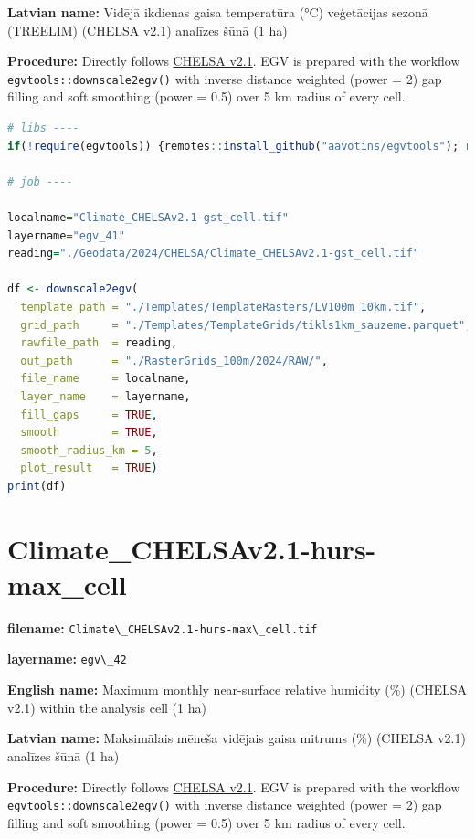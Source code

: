 \documentclass[
]{book}
\newcommand{\passthrough}[1]{#1}
\begin{document}
\textbf{Latvian name:} Vidējā ikdienas gaisa temperatūra (°C) veģetācijas sezonā (TREELIM) (CHELSA v2.1) analīzes šūnā (1 ha)

\textbf{Procedure:} Directly follows \hyperref[Ch04.11]{CHELSA v2.1}. EGV is prepared with the
workflow \passthrough{\lstinline!egvtools::downscale2egv()!} with inverse distance weighted (power = 2)
gap filling and soft smoothing (power = 0.5) over 5 km radius of every cell.

\begin{lstlisting}[language=R]
# libs ----
if(!require(egvtools)) {remotes::install_github("aavotins/egvtools"); require(egvtools)}

# job ----

localname="Climate_CHELSAv2.1-gst_cell.tif"
layername="egv_41"
reading="./Geodata/2024/CHELSA/Climate_CHELSAv2.1-gst_cell.tif"

df <- downscale2egv(
  template_path = "./Templates/TemplateRasters/LV100m_10km.tif",
  grid_path     = "./Templates/TemplateGrids/tikls1km_sauzeme.parquet",
  rawfile_path  = reading,
  out_path      = "./RasterGrids_100m/2024/RAW/",
  file_name     = localname,
  layer_name    = layername,
  fill_gaps     = TRUE,
  smooth        = TRUE,
  smooth_radius_km = 5,
  plot_result   = TRUE)
print(df)
\end{lstlisting}

\section{Climate\_CHELSAv2.1-hurs-max\_cell}\label{ch06.042}

\textbf{filename:} \passthrough{\lstinline!Climate\_CHELSAv2.1-hurs-max\_cell.tif!}

\textbf{layername:} \passthrough{\lstinline!egv\_42!}

\textbf{English name:} Maximum monthly near-surface relative humidity (\%) (CHELSA v2.1) within the analysis cell (1 ha)

\textbf{Latvian name:} Maksimālais mēneša vidējais gaisa mitrums (\%) (CHELSA v2.1) analīzes šūnā (1 ha)

\textbf{Procedure:} Directly follows \hyperref[Ch04.11]{CHELSA v2.1}. EGV is prepared with the
workflow \passthrough{\lstinline!egvtools::downscale2egv()!} with inverse distance weighted (power = 2)
gap filling and soft smoothing (power = 0.5) over 5 km radius of every cell.
\end{document}
